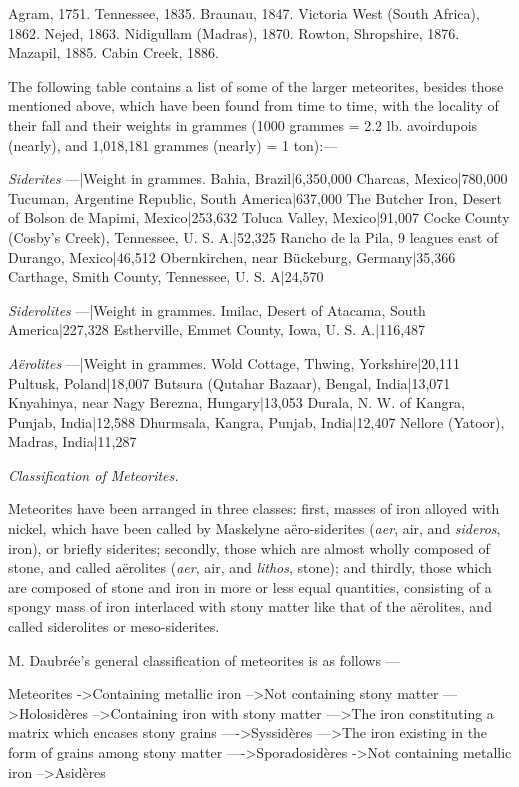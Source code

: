 \documentclass[a4paper, 12pt, oneside, polutonikogreek, english]{article}
\begin{document}
Agram, 1751. 
Tennessee, 1835. 
Braunau, 1847. 
Victoria West (South Africa), 1862. 
Nejed, 1863. 
Nidigullam (Madras), 1870. 
Rowton, Shropshire, 1876. 
Mazapil, 1885. 
Cabin Creek, 1886.

The following table contains a list of some of the larger meteorites, besides those mentioned above, which have been found from time to time, with the locality of their fall and their weights in grammes (1000 grammes = 2.2 lb. avoirdupois (nearly), and 1,018,181 grammes (nearly) = 1 ton):---

\emph{Siderites} ---|Weight in grammes. 
Bahia, Brazil|6,350,000 
Charcas, Mexico|780,000 
Tucuman, Argentine Republic, South America|637,000 
The Butcher Iron, Desert of Bolson de Mapimi, Mexico|253,632 
Toluca Valley, Mexico|91,007 
Cocke County (Cosby's Creek), Tennessee, U. S. A.|52,325 
Rancho de la Pila, 9 leagues east of Durango, Mexico|46,512 
Obernkirchen, near Bückeburg, Germany|35,366 
Carthage, Smith County, Tennessee, U. S. A|24,570 

\emph{Siderolites} ---|Weight in grammes. 
Imilac, Desert of Atacama, South America|227,328 
Estherville, Emmet County, Iowa, U. S. A.|116,487 

\emph{Aërolites} ---|Weight in grammes. 
Wold Cottage, Thwing, Yorkshire|20,111 
Pultusk, Poland|18,007 
Butsura (Qutahar Bazaar), Bengal, India|13,071 
Knyahinya, near Nagy Berezna, Hungary|13,053 
Durala, N. W. of Kangra, Punjab, India|12,588 
Dhurmsala, Kangra, Punjab, India|12,407 
Nellore (Yatoor), Madras, India|11,287 

\emph{Classification of Meteorites.}

Meteorites have been arranged in three classes: first, masses of iron alloyed with nickel, which have been called by Maskelyne aëro-siderites (\emph{aer}, air, and \emph{sideros}, iron), or briefly siderites; secondly, those which are almost wholly composed of stone, and called aërolites (\emph{aer}, air, and \emph{lithos}, stone); and thirdly, those which are composed of stone and iron in more or less equal quantities, consisting of a spongy mass of iron interlaced with stony matter like that of the aërolites, and called siderolites or meso-siderites.

M. Daubrée's general classification of meteorites is as follows ---

Meteorites 
->Containing metallic iron 
-->Not containing stony matter 
--->Holosidères 
-->Containing iron with stony matter 
--->The iron constituting a matrix which encases stony grains 
---->Syssidères 
--->The iron existing in the form of grains among stony matter 
---->Sporadosidères 
->Not containing metallic iron 
-->Asidères
\end{document}
